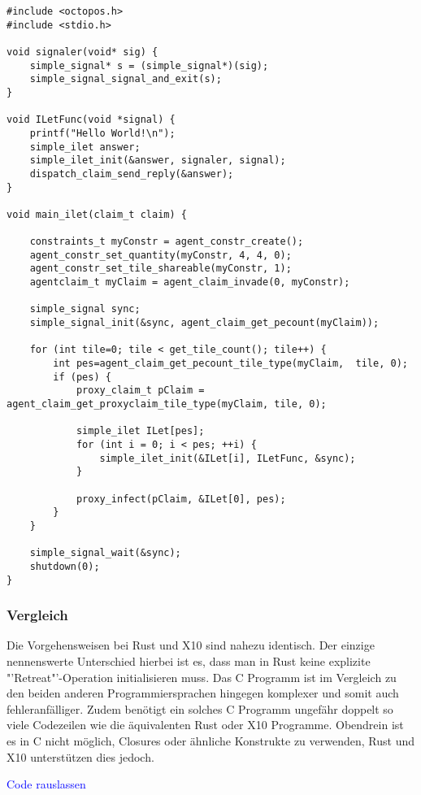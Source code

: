 \begin{lstlisting}[float,caption={Minimales Invade, Infect, Retreat in C},label=code:c_minimal_infect]
#include <octopos.h>
#include <stdio.h>

void signaler(void* sig) {
    simple_signal* s = (simple_signal*)(sig);
    simple_signal_signal_and_exit(s);
}

void ILetFunc(void *signal) {
    printf("Hello World!\n");
    simple_ilet answer;
    simple_ilet_init(&answer, signaler, signal);
    dispatch_claim_send_reply(&answer);
}

void main_ilet(claim_t claim) {

    constraints_t myConstr = agent_constr_create();
    agent_constr_set_quantity(myConstr, 4, 4, 0);
    agent_constr_set_tile_shareable(myConstr, 1);
    agentclaim_t myClaim = agent_claim_invade(0, myConstr);

    simple_signal sync;
    simple_signal_init(&sync, agent_claim_get_pecount(myClaim));

    for (int tile=0; tile < get_tile_count(); tile++) {
        int pes=agent_claim_get_pecount_tile_type(myClaim,  tile, 0);
        if (pes) {
            proxy_claim_t pClaim = agent_claim_get_proxyclaim_tile_type(myClaim, tile, 0);

            simple_ilet ILet[pes];
            for (int i = 0; i < pes; ++i) {
                simple_ilet_init(&ILet[i], ILetFunc, &sync);
            }

            proxy_infect(pClaim, &ILet[0], pes);
        }
    }

    simple_signal_wait(&sync);
    shutdown(0);
}
\end{lstlisting}

\subsubsection{Vergleich}

Die Vorgehensweisen bei Rust und X10 sind nahezu identisch. Der einzige nennenswerte Unterschied hierbei ist es, dass
man in Rust keine explizite "'Retreat"'-Operation initialisieren muss.
Das C Programm ist im Vergleich zu den beiden anderen Programmiersprachen hingegen komplexer und somit auch
fehleranfälliger. Zudem benötigt ein solches C Programm ungefähr doppelt so viele 
Codezeilen wie die äquivalenten Rust oder X10 Programme. Obendrein ist es in C nicht möglich, Closures oder
ähnliche Konstrukte zu verwenden, Rust und X10 unterstützen dies jedoch.

\textcolor{blue}{Code rauslassen}

